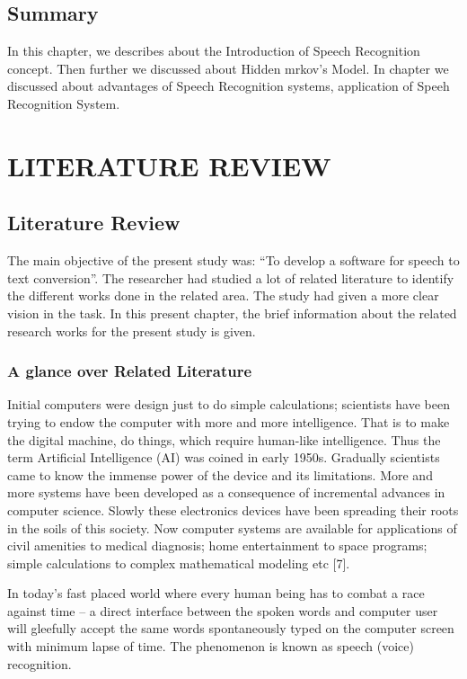 \documentclass[12pt,a4paper,oneside]{memoir}
\begin{document}
\section{Summary}
In this chapter, we describes about the Introduction of Speech Recognition concept. Then further we discussed about Hidden mrkov's Model. In chapter we discussed about advantages of Speech Recognition systems, application of Speeh Recognition System.

\chapter{LITERATURE REVIEW}
\section{Literature Review}
The main objective of the present study was: “To develop a software for speech to
text conversion”. The researcher had studied a lot of related literature to identify the
different works done in the related area. The study had given a more clear vision in
the task. In this present chapter, the brief information about the related research works
for the present study is given.
\subsection{A glance over Related Literature}
Initial computers were design just to do simple calculations; scientists have been
trying to endow the computer with more and more intelligence. That is to make the
digital machine, do things, which require human-like intelligence. Thus the term
Artificial Intelligence (AI) was coined in early 1950s. Gradually scientists came to
know the immense power of the device and its limitations. More and more systems
have been developed as a consequence of incremental advances in computer science.
Slowly these electronics devices have been spreading their roots in the soils of this
society. Now computer systems are available for applications of civil amenities to
medical diagnosis; home entertainment to space programs; simple calculations to
complex mathematical modeling etc [7].

In today’s fast placed world where every human being has to combat a race against
time – a direct interface between the spoken words and computer user will gleefully
accept the same words spontaneously typed on the computer screen with minimum
lapse of time. The phenomenon is known as speech (voice) recognition.
\end{document}
